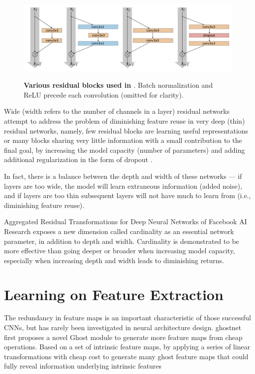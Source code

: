 \begin{figure}[t]
\begin{center}
\centering
\includegraphics[width=\textwidth]{thesis-template-master/images/wide.png}
\label{fig:cellnet}
\end{center}
\caption{\textbf{Various residual blocks used in \cite{wideres}}. Batch normalization and ReLU precede
each convolution (omitted for clarity).}
\end{figure}

Wide (width refers to the number of channels in a layer) residual networks \cite{wideres} attempt to address the problem of diminishing feature reuse in very deep (thin) residual networks, namely, few residual blocks are learning useful representations or many blocks sharing very little information with a small contribution to the final goal, by increasing the model capacity (number of parameters) and adding additional regularization in the form of dropout \cite{dropout}.

In fact, there is a balance between the depth and width of these networks — if layers are too wide, the model will learn extraneous information (added noise), and if layers are too thin subsequent layers will not have much to learn from (i.e., diminishing feature reuse).

Aggregated Residual Transformations for Deep Neural Networks \cite{aggres} of Facebook AI Research exposes a new dimension called cardinality as an essential network parameter, in addition to depth and width. Cardinality is demonstrated to be more effective than going deeper or broader when increasing model capacity, especially when increasing depth and width leads to diminishing returns.




\section{Learning on Feature Extraction}

The redundancy in feature maps is an important characteristic of those successful CNNs, but has rarely been investigated in neural architecture design. ghostnet \cite{19}  first proposes a novel Ghost module to generate more feature maps from cheap operations. Based on a set of intrinsic feature maps, by applying a series of linear transformations with cheap cost to generate many ghost feature maps that could fully reveal information underlying intrinsic features \cite{19}

